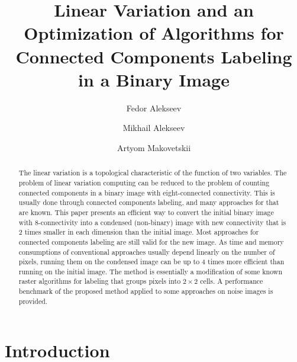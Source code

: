\documentclass[hidelinks]{llncs}
\begin{document}
\title{Linear Variation and an Optimization of Algorithms for Connected
Components Labeling in a Binary Image}

\author{Fedor Alekseev \and Mikhail Alekseev
\and Artyom Makovetskii}


\maketitle              %

\begin{abstract}
The linear variation is a topological characteristic of the function of two variables.
The problem of linear variation computing can be reduced to the problem of counting connected components in a binary image with eight-connected connectivity.
This is usually done through connected components labeling, and many approaches for that are known.
This paper presents an efficient way to convert the initial binary image with 8-connectivity into a condensed (non-binary) image with new connectivity that is 2 times smaller in each dimension than the initial image.
Most approaches for connected components labeling are still valid for the new image.
As time and memory consumptions of conventional approaches usually depend linearly on the number of pixels,
running them on the condensed image can be up to 4 times more efficient than running on the initial image.
The method is essentially a modification of some known raster algorithms for labeling that groups pixels into $2 \times 2$ cells.
A performance benchmark of the proposed  method applied to some approaches on noise images is provided.

\end{abstract}

\section{Introduction}
\end{document}
